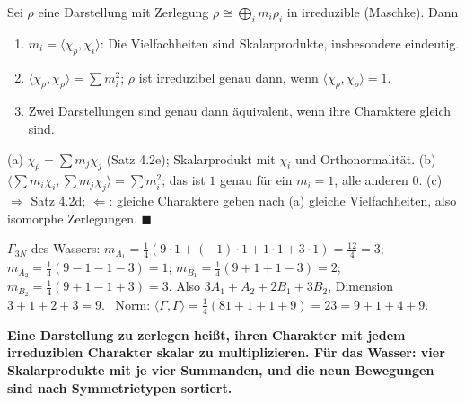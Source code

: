 \begin{merksatz}
Sei $\rho$ eine Darstellung mit Zerlegung $\rho\cong\bigoplus_im_i\rho_i$ in irreduzible (Maschke). Dann
\begin{enumerate}[label=(\alph*), leftmargin=1.6em]
\item $m_i = \langle\chi_\rho, \chi_i\rangle$: Die Vielfachheiten sind Skalarprodukte, insbesondere eindeutig.
\item $\langle\chi_\rho, \chi_\rho\rangle = \sum m_i^{2}$; $\rho$ ist irreduzibel genau dann, wenn $\langle\chi_\rho, \chi_\rho\rangle = 1$.
\item Zwei Darstellungen sind genau dann äquivalent, wenn ihre Charaktere gleich sind.
\end{enumerate}

(a) $\chi_\rho = \sum m_j\chi_j$ (Satz 4.2e); Skalarprodukt mit $\chi_i$ und Orthonormalität. (b) $\langle\sum m_i\chi_i, \sum m_j\chi_j\rangle = \sum m_i^{2}$; das ist $1$ genau für ein $m_i = 1$, alle anderen $0$. (c) $\Rightarrow$ Satz 4.2d; $\Leftarrow$: gleiche Charaktere geben nach (a) gleiche Vielfachheiten, also isomorphe Zerlegungen. $\blacksquare$

$\Gamma_{3N}$ des Wassers: $m_{A_1} = \frac14(9\cdot1 + (-1)\cdot1 + 1\cdot1 + 3\cdot1) = \frac{12}{4} = 3$; $m_{A_2} = \frac14(9 - 1 - 1 - 3) = 1$; $m_{B_1} = \frac14(9 + 1 + 1 - 3) = 2$; $m_{B_2} = \frac14(9 + 1 - 1 + 3) = 3$. Also $3A_1 + A_2 + 2B_1 + 3B_2$, Dimension $3 + 1 + 2 + 3 = 9$. \checkmark\ Norm: $\langle\Gamma, \Gamma\rangle = \frac14(81 + 1 + 1 + 9) = 23 = 9 + 1 + 4 + 9$. \checkmark

\begin{center}
\begin{minipage}{0.9\textwidth}
\textbf{Eine Darstellung zu zerlegen heißt, ihren Charakter mit jedem irreduziblen Charakter skalar zu multiplizieren. Für das Wasser: vier Skalarprodukte mit je vier Summanden, und die neun Bewegungen sind nach Symmetrietypen sortiert.}
\end{minipage}
\end{center}
\end{merksatz}

